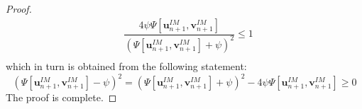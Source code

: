 \documentclass[10pt,a4paper]{amsart}
\begin{document}
\begin{proof}
    \begin{equation}
      \begin{array}{ll}
            &\dfrac{4 \psi \Psi[\boldsymbol{u}_{n+1}^{IM},\boldsymbol{v}_{n+1}^{IM}] }{\left(\Psi[\boldsymbol{u}_{n+1}^{IM},\boldsymbol{v}_{n+1}^{IM}]+\psi\right)^2} \le 1 \\
      \end{array} 
      \label{eqn:4thIdentity1}
    \end{equation}
    which in turn is obtained from the following statement:
    \begin{equation}
        {\left(\Psi[\boldsymbol{u}_{n+1}^{IM},\boldsymbol{v}_{n+1}^{IM}]-\psi\right)^2} = {\left(\Psi[\boldsymbol{u}_{n+1}^{IM},\boldsymbol{v}_{n+1}^{IM}]+\psi\right)^2} - 4 \psi \Psi[\boldsymbol{u}_{n+1}^{IM},\boldsymbol{v}_{n+1}^{IM}] \ge 0
    \end{equation}
  The proof is complete.
\end{proof}
\end{document}
